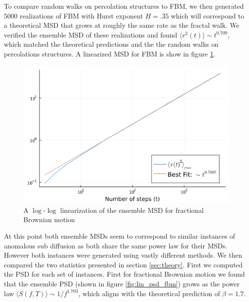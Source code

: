 \documentclass[%
 reprint,
 amsmath,amssymb,
 aps,
]{revtex4-2}
\begin{document}
To compare random walks on percolation structures to FBM, we then generated $5000$ realizations of FBM with Hurst exponent $H=.35$ which will correspond to a theoretical MSD that grows at roughly the same rate as the fractal walk. We verified the ensemble MSD of these realizations and found $\langle r^2(t)\rangle\sim t^{0.709}$, which matched the theoretical predictions and the the random walks on percolations structures. A linearized MSD for FBM is show in figure \ref{fig:linmsd_fbm}.

\begin{figure}
    \centering
    \includegraphics[scale=.36]{lin_ens_msd_fbm.png}
    \caption{A $\log$-$\log$ linearization of the ensemble MSD for fractional Brownian motion}
    \label{fig:linmsd_fbm}
\end{figure}

At this point both ensemble MSDs seem to correspond to similar instances of anomalous sub diffusion as both share the same power law for their MSDs. However both instances were generated using vastly different methods. We then compared the two statistics presented in section \ref{sec:theory}. First we computed the PSD for each set of instances. First for fractional Brownian motion we found that the ensemble PSD (shown in figure \ref{fig:lin_psd_fbm}) grows as the power law $\langle S(f,T) \rangle\sim 1/f^{1.703}$, which aligns with the theoretical prediction of $\beta=1.7$.
\end{document}
